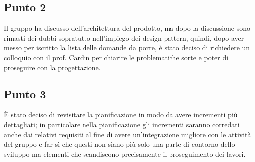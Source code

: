 \subsection{Punto 2}
Il gruppo ha discusso dell'architettura del prodotto\glosp, ma dopo la discussione sono rimasti dei dubbi sopratutto nell'impiego dei design pattern, quindi, dopo aver messo per iscritto la lista delle domande da porre, è stato deciso di richiedere un colloquio con il prof. Cardin per chiarire le problematiche sorte e poter di proseguire con la progettazione\glo.

\subsection{Punto 3}
È stato deciso di revisitare la pianificazione in modo da avere incrementi più dettagliati; in particolare nella pianificazione gli incrementi saranno corredati anche dai relativi requisiti al fine di avere un'integrazione migliore con le attività del gruppo e far sì che questi non siano più solo una parte di contorno dello sviluppo ma elementi che scandiscono precisamente il proseguimento dei lavori.
